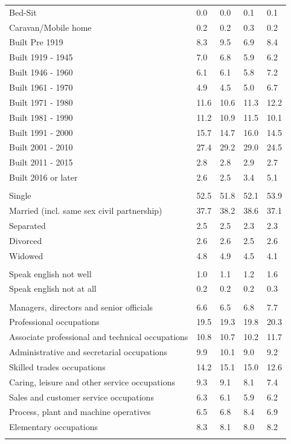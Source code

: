 \documentclass{article}
\begin{document}
\begin{table}[h]
\begin{tabular}{KTTTT}
Bed-Sit & 0.0& 0.0& 0.1& 0.1\\
Caravan/Mobile home & 0.2& 0.2& 0.3& 0.2\\
    \hline
Built Pre 1919 & 8.3& 9.5& 6.9& 8.4\\
Built 1919 - 1945 & 7.0& 6.8& 5.9& 6.2\\
Built  1946 - 1960 & 6.1& 6.1& 5.8& 7.2\\
Built  1961 - 1970 & 4.9& 4.5& 5.0& 6.7\\
Built  1971 - 1980 & 11.6& 10.6& 11.3& 12.2\\
Built  1981 - 1990 & 11.2& 10.9& 11.5& 10.1\\
Built  1991 - 2000 & 15.7& 14.7& 16.0& 14.5\\
Built  2001 - 2010 & 27.4& 29.2& 29.0& 24.5\\
Built  2011 - 2015 & 2.8& 2.8& 2.9& 2.7\\
Built  2016 or later & 2.6& 2.5& 3.4& 5.1\\
\hline
    \\
    \hline
Single & 52.5& 51.8& 52.1& 53.9\\
Married (incl. same sex civil partnership) & 37.7& 38.2& 38.6& 37.1\\
Separated  & 2.5& 2.5& 2.3& 2.3\\
Divorced  & 2.6& 2.6& 2.5& 2.6\\
Widowed & 4.8& 4.9& 4.5& 4.1\\
\hline
    \\ 
    \hline
Speak english not well & 1.0& 1.1& 1.2& 1.6\\
Speak english not at all & 0.2& 0.2& 0.2& 0.3\\
\hline
    \\
    \hline
Managers, directors and senior officials & 6.6& 6.5& 6.8& 7.7\\
Professional occupations & 19.5& 19.3& 19.8& 20.3\\
Associate professional and technical occupations & 10.8& 10.7& 10.2& 11.7\\
Administrative and secretarial occupations &  9.9& 10.1&  9.0&  9.2\\
Skilled trades occupations & 14.2& 15.1& 15.0& 12.6\\
Caring, leisure and other service occupations & 9.3& 9.1& 8.1& 7.4\\
Sales and customer service occupations & 6.3& 6.1& 5.9& 6.2\\
Process, plant and machine operatives & 6.5& 6.8& 8.4& 6.9\\
Elementary occupations & 8.3& 8.1& 8.0& 8.2\\
\hline
\end{tabular}
\end{table}
\end{document}
